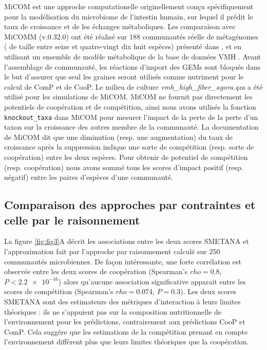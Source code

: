 MiCOM est une approche computationelle originellement conçu spécifiquement pour la modélisation du microbiome de l'intestin humain, sur lequel il prédit le taux de croissance et de les échanges métaboliques. Les comparaison avec MiCOMM (v.0.32.0) ont été réalisé sur 188 communautés réelle de métagénomes ( de taille entre seize et quatre-vingt dix huit espèces) présenté dans \citep{diener2020}, et en utilisant un ensemble de modèle métabolique de la base de données VMH \citep{Noronha.2018}. Avant l'assemblage de communauté, les réactions d'import des GEMs sont bloqués dans le but d'assurer que seul les graines seront utilisés comme nutriment pour le calcul de ComP et de CooP. Le milieu de culture \textit{vmh\_high\_fiber\_agora.qza} a été utilisé pour les simulations de MiCOM. MiCOM ne fournit pas directement les potentiels de coopération et de compétition, ainsi nous avons utilisés la fonction \texttt{knockout\_taxa} dans MiCOM pour mesurer l'impact de la perte de la perte d'un taxon sur la croissance des autres membre de la communauté. La documentation de MiCOM dit que une diminution (resp. une augmentation) du taux de croissance après la suppression indique une sorte de compétition (resp. sorte de coopération) entre les deux espèces. Pour obtenir de potentiel de compétition (resp. coopération) nous avons sommé tous les scores d'impact positif (resp. négatif) entre les paires d'espèces d'une communauté.

\subsection{Comparaison des approches par contraintes et celle par le raisonnement}

La figure \ref{fig:fig3}A décrit les associations entre les deux scores SMETANA et l'approximation fait par l'approche par raisonnement calculé sur 250 communautés microbiennes. De façon intéressante, une forte corrélation est observée entre les deux scores de coopération (Spearman's $rho = 0.8$, $P < \num{2.2e-16}$) alors qu'aucune association significative apparait entre les scores de compétition (Spearman's $rho = 0.074$, $P = 0.3$). Les deux scores SMETANA sont des estimateurs des métriques d'interaction à leurs limites théoriques : ils ne s'appuient pas sur la composition nutritionnelle de l'environnement pour les prédictions, contrairement aux prédictions \textsf{CooP} et \textsf{ComP}. Cela suggère que les estimations de la compétition prenant en compte l'environnement diffèrent plus que leurs limites théoriques que la coopération.

